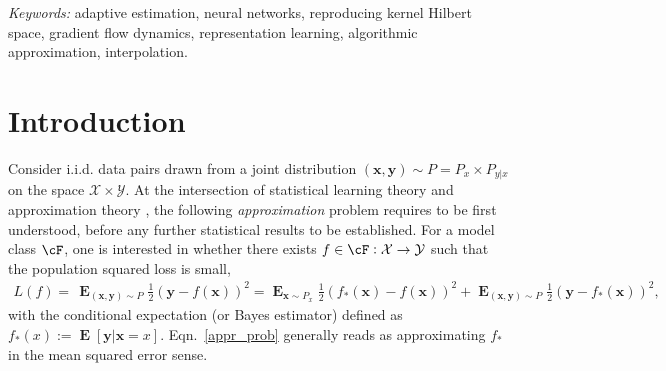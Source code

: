\documentclass[11pt]{article}
\def\spacingset#1{\renewcommand{\baselinestretch}%
{#1}\small\normalsize} \spacingset{1}
\numberwithin{equation}{section}
\def\E{\mathop{\mathbf{E}}}
\def\deq{:=}
\def\bd#1{\mathbf{#1}}
\def\bx{\bd{x}}
\def\by{\bd{y}}
\begin{document}
\noindent%
{\it Keywords:}  adaptive estimation, neural networks, reproducing kernel Hilbert space, gradient flow dynamics, representation learning, algorithmic approximation, interpolation.
\vfill

\newpage
\spacingset{1.5} %





\section{Introduction}
\label{sec:intro}

Consider i.i.d. data pairs drawn from a joint distribution $(\bx, \by) \sim P = P_{x} \times P_{y|x}$ on the space $\mathcal{X} \times \mathcal{Y}$. 
At the intersection of statistical learning theory \citep{vapnik1998statistical} and approximation theory \citep{cybenko1989approximation}, the following \textit{approximation} problem requires to be first understood, before any further statistical results to be established. 
For a model class $\cF$, one is interested in whether there exists $f \in \cF: \mathcal{X} \rightarrow \mathcal{Y}$ such that the population squared loss is small,
\begin{align}\label{appr_prob}
     L(f) = \,\E_{(\bx,\bd{y})\sim P}\frac{1}{2}\left( \bd{y}-f(\bx) \right)^2 
     = \E_{\bx \sim P_x} \frac{1}{2} \left( f_*(\bx) - f(\bx) \right)^2 + \E_{(\bx,\bd{y})\sim P} \frac{1}{2} \left( \by - f_*(\bx) \right)^2,
\end{align}
with the conditional expectation (or Bayes estimator) defined as $f_*(x) \deq \E[\bd{y}|\bd{x} = x]$. Eqn.~\eqref{appr_prob} generally reads as approximating $f_*$ in the mean squared error sense.
\end{document}
